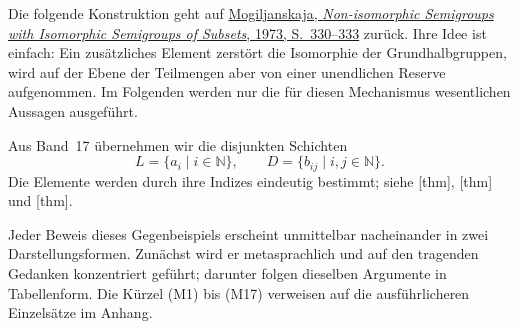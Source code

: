\documentclass[main.tex]{subfiles}
\begin{document}
Die folgende Konstruktion geht auf
\href{https://doi.org/10.1007/BF02389140}%
  {Mogiljanskaja, \emph{Non-isomorphic Semigroups with Isomorphic
  Semigroups of Subsets}, 1973, S.~330--333}
zurück. Ihre Idee ist einfach: Ein zusätzliches Element zerstört die
Isomorphie der Grundhalbgruppen, wird auf der Ebene der Teilmengen aber von
einer unendlichen Reserve aufgenommen. Im Folgenden werden nur die für diesen
Mechanismus wesentlichen Aussagen ausgeführt.

Aus Band~17 übernehmen wir die disjunkten Schichten
\[
  L=\{a_i\mid i\in\mathbb N\},
  \qquad
  D=\{b_{ij}\mid i,j\in\mathbb N\}.
\]
Die Elemente werden durch ihre Indizes eindeutig bestimmt; siehe
[thm],
[thm] und
[thm].

Jeder Beweis dieses Gegenbeispiels erscheint unmittelbar nacheinander in zwei
Darstellungsformen. Zunächst wird er metasprachlich und auf den tragenden
Gedanken konzentriert geführt; darunter folgen dieselben Argumente in
Tabellenform. Die Kürzel \textup{(M1)} bis \textup{(M17)} verweisen auf die
ausführlicheren Einzelsätze im Anhang.

\end{document}
